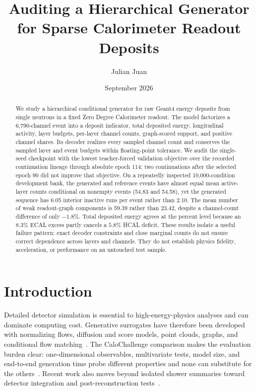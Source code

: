 \documentclass[11pt]{article}
\title{Auditing a Hierarchical Generator for Sparse Calorimeter Readout Deposits}
\author{Julian Juan}
\date{September 2026}
\begin{document}
\maketitle

\begin{abstract}
We study a hierarchical conditional generator for raw Geant4 energy deposits from single neutrons in a fixed Zero Degree Calorimeter readout. The model factorizes a 6,790-channel event into a deposit indicator, total deposited energy, longitudinal activity, layer budgets, per-layer channel counts, graph-scored support, and positive channel shares. Its decoder realizes every sampled channel count and conserves the sampled layer and event budgets within floating-point tolerance. We audit the single-seed checkpoint with the lowest teacher-forced validation objective over the recorded continuation lineage through absolute epoch 114; two continuations after the selected epoch 90 did not improve that objective. On a repeatedly inspected 10,000-condition development bank, the generated and reference events have almost equal mean active-layer counts conditional on nonempty events (54.83 and 54.58), yet the generated sequence has 6.05 interior inactive runs per event rather than 2.10. The mean number of weak readout-graph components is 59.39 rather than 23.42, despite a channel-count difference of only $-1.8\%$. Total deposited energy agrees at the percent level because an $8.3\%$ ECAL excess partly cancels a $5.8\%$ HCAL deficit. These results isolate a useful failure pattern: exact decoder constraints and close marginal counts do not ensure correct dependence across layers and channels. They do not establish physics fidelity, acceleration, or performance on an untouched test sample.
\end{abstract}

\section{Introduction}

Detailed detector simulation is essential to high-energy-physics analyses and can dominate computing cost. Generative surrogates have therefore been developed with normalizing flows, diffusion and score models, point clouds, graphs, and conditional flow matching~\cite{caloflow,calodiffusion,calograph,caloclouds2,calodream}. The CaloChallenge comparison makes the evaluation burden clear: one-dimensional observables, multivariate tests, model size, and end-to-end generation time probe different properties and none can substitute for the others~\cite{calochallenge}. Recent work also moves beyond isolated shower summaries toward detector integration and post-reconstruction tests~\cite{physicsbenchmark}.
\end{document}
